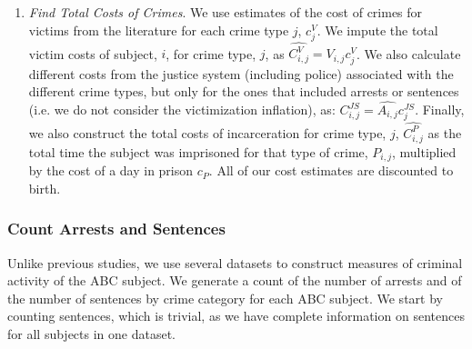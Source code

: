 \begin{enumerate}
\item \textit{Find Total Costs of Crimes}. We use estimates of the cost of crimes for victims from the literature for each crime type $j$, $c_j^V$. We impute the total victim costs of subject, $i$, for crime type, $j$, as $\widehat{C_{i,j}^V}=\widehat{V_{i,j}} c_j^V$. We also calculate different costs from the justice system (including police) associated with the different crime types, but only for the ones that included arrests or sentences (i.e. we do not consider the victimization inflation), as: $C_{i,j}^{JS}=\widehat{A_{i,j}} c_j^{JS}$. Finally, we also construct the total costs of incarceration for crime type, $j$, $\widehat{C_{i,j}^{P}}$ as the total time the subject was imprisoned for that type of crime, $P_{i,j}$, multiplied by the cost of a day in prison $c_P$. All of our cost estimates are discounted to birth.
\end{enumerate}


\subsubsection{Count Arrests and Sentences}
\noindent Unlike previous studies, we use several datasets to construct measures of criminal activity of the ABC subject. We generate a count of the number of arrests and of the number of sentences by crime category for each ABC subject. We start by counting sentences, which is trivial, as we have complete information on sentences for all subjects in one dataset. \\

